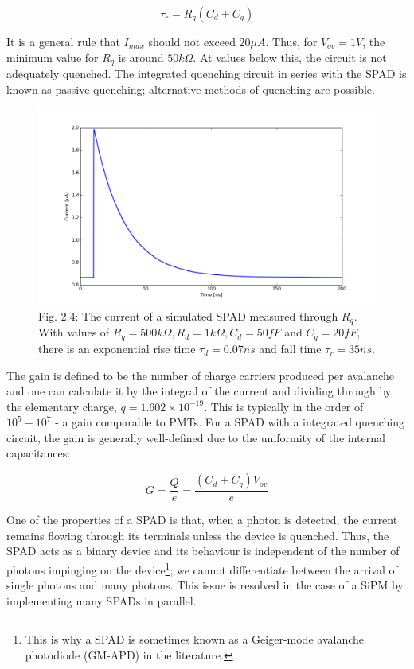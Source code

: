 \[
   \tau_r = R_q(C_d+C_q)  \tag{2.2}
\]

\noindent It is a general rule that $I_{max}$ should not exceed $20\mu A$. \cite{acerbi2019} Thus, for $V_{ov}=1V$, the minimum value for $R_q$ is around $50k\Omega$. At values below this, the circuit is not adequately quenched. The integrated quenching circuit in series with the SPAD is known as passive quenching; alternative methods of quenching are possible. \cite{cova1996}

\begin{figure}[h]
  \centering
  \includegraphics[width=\linewidth]{Graphics/SPAD/SingleCurrentFINAL}
  {\caption*{Fig. 2.4: The current of a simulated SPAD measured through $R_q$. With values of $R_q=500k\Omega, R_d=1k\Omega, C_d=50fF$ and $C_q=20fF$, there is an exponential rise time $\tau_d=0.07ns$ and fall time $\tau_r=35ns$.}}
\end{figure}

The gain is defined to be the number of charge carriers produced per avalanche and one can calculate it by the integral of the current and dividing through by the elementary charge, $q=1.602\times 10^{-19}$. This is typically in the order of $10^5-10^7$ - a gain comparable to PMTs. For a SPAD with a integrated quenching circuit, the gain is generally well-defined due to the uniformity of the internal capacitances: \cite{gundacker2020}

\[
   G=\frac{Q}{e}=\frac{(C_d+C_q)V_{ov}}{e} \tag{2.3}
\]

\noindent One of the properties of a SPAD is that, when a photon is detected, the current remains flowing through its terminals unless the device is quenched. Thus, the SPAD acts as a binary device and its behaviour is independent of the number of photons impinging on the device\footnote{This is why a SPAD is sometimes known as a Geiger-mode avalanche photodiode (GM-APD) in the literature.}; we cannot differentiate between the arrival of single photons and many photons. This issue is resolved in the case of a SiPM by implementing many SPADs in parallel.

